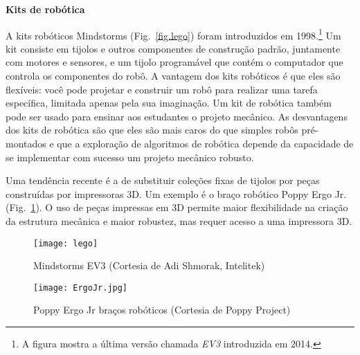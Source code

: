 %
%
%
\medskip

\noindent\textbf{Kits de robótica}

A \lego{} kits robóticos Mindstorms (Fig.~\ref{fig.lego}) foram introduzidos em 1998.\footnote{A figura mostra a última versão chamada \emph{EV3} introduzida em 2014.} Um kit consiste em tijolos e outros componentes de construção padrão, juntamente com motores e sensores, e um tijolo programável que contém o computador que controla os componentes do robô. A vantagem dos kits robóticos é que eles são flexíveis: você pode projetar e construir um robô para realizar uma tarefa específica, limitada apenas pela sua imaginação. Um kit de robótica também pode ser usado para ensinar aos estudantes o projeto mecânico. As desvantagens dos kits de robótica são que eles são mais caros do que simples robôs pré-montados e que a exploração de algoritmos de robótica depende da capacidade de se implementar com sucesso um projeto mecânico robusto.

Uma tendência recente é a de substituir coleções fixas de tijolos por peças construídas por impressoras 3D. Um exemplo é o braço robótico Poppy Ergo Jr. (Fig.~\ref{fig.poppy}). O uso de peças impressas em 3D permite maior flexibilidade na criação da estrutura mecânica e maior robustez, mas requer acesso a uma impressora 3D. 

\begin{figure}
\begin{minipage}{.45\textwidth}
\begin{center}
\texttt{[image: lego]}
\end{center}
\caption{\lego{} Mindstorms EV3 (Cortesia de Adi Shmorak, Intelitek)}
\label{fig.lego}
\end{minipage}
\hspace{\fill}
\begin{minipage}{.45\textwidth}
\begin{center}
\texttt{[image: ErgoJr.jpg]}
\end{center}
\caption{Poppy Ergo Jr braços robóticos (Cortesia de Poppy Project)}
\label{fig.poppy}
\end{minipage}
\end{figure}


